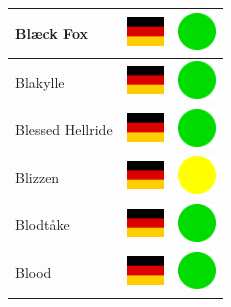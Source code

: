 \documentclass[12pt, a4paper, twoside]{report}
\begin{document}
\begin{center}
\begin{longtable}{|p{5cm}|p{2cm}|p{2cm}|}
 Blæck Fox                                                  & \includegraphics[width=1cm]{../4x3/de} &   \includegraphics[width=1cm]{../likes/y} \\ \hline
 Blakylle                                                   & \includegraphics[width=1cm]{../4x3/de} &   \includegraphics[width=1cm]{../likes/y} \\ \hline
 Blessed Hellride                                           & \includegraphics[width=1cm]{../4x3/de} &   \includegraphics[width=1cm]{../likes/y} \\ \hline
 Blizzen                                                    & \includegraphics[width=1cm]{../4x3/de} &   \includegraphics[width=1cm]{../likes/m} \\ \hline
 Blodtåke                                                   & \includegraphics[width=1cm]{../4x3/de} &   \includegraphics[width=1cm]{../likes/y} \\ \hline
 Blood                                                      & \includegraphics[width=1cm]{../4x3/de} &   \includegraphics[width=1cm]{../likes/y} \\ \hline

\end{longtable}
\end{center}
\end{document}
